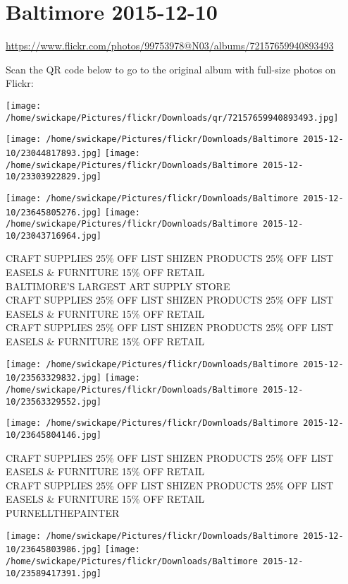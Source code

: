 \documentclass[10pt,letterpaper]{article}
\title{}
\author{}
\date{}
\begin{document}
\section*{Baltimore 2015-12-10}

\url{https://www.flickr.com/photos/99753978@N03/albums/72157659940893493}

Scan the QR code below to go to the original album with full-size photos on Flickr:

\texttt{[image: /home/swickape/Pictures/flickr/Downloads/qr/72157659940893493.jpg]}
\pagebreak

\texttt{[image: /home/swickape/Pictures/flickr/Downloads/Baltimore 2015-12-10/23044817893.jpg]}
\texttt{[image: /home/swickape/Pictures/flickr/Downloads/Baltimore 2015-12-10/23303922829.jpg]}

\texttt{[image: /home/swickape/Pictures/flickr/Downloads/Baltimore 2015-12-10/23645805276.jpg]}
\texttt{[image: /home/swickape/Pictures/flickr/Downloads/Baltimore 2015-12-10/23043716964.jpg]}

CRAFT SUPPLIES 25\% OFF LIST SHIZEN PRODUCTS 25\% OFF LIST EASELS \& FURNITURE 15\% OFF RETAIL\\
BALTIMORE'S LARGEST ART SUPPLY STORE\\
CRAFT SUPPLIES 25\% OFF LIST SHIZEN PRODUCTS 25\% OFF LIST EASELS \& FURNITURE 15\% OFF RETAIL\\
CRAFT SUPPLIES 25\% OFF LIST SHIZEN PRODUCTS 25\% OFF LIST EASELS \& FURNITURE 15\% OFF RETAIL
\pagebreak

\texttt{[image: /home/swickape/Pictures/flickr/Downloads/Baltimore 2015-12-10/23563329832.jpg]}
\texttt{[image: /home/swickape/Pictures/flickr/Downloads/Baltimore 2015-12-10/23563329552.jpg]}

\vspace{0.25in}
\texttt{[image: /home/swickape/Pictures/flickr/Downloads/Baltimore 2015-12-10/23645804146.jpg]}

CRAFT SUPPLIES 25\% OFF LIST SHIZEN PRODUCTS 25\% OFF LIST EASELS \& FURNITURE 15\% OFF RETAIL\\
CRAFT SUPPLIES 25\% OFF LIST SHIZEN PRODUCTS 25\% OFF LIST EASELS \& FURNITURE 15\% OFF RETAIL\\
PURNELLTHEPAINTER
\pagebreak

\texttt{[image: /home/swickape/Pictures/flickr/Downloads/Baltimore 2015-12-10/23645803986.jpg]}
\texttt{[image: /home/swickape/Pictures/flickr/Downloads/Baltimore 2015-12-10/23589417391.jpg]}
\end{document}
